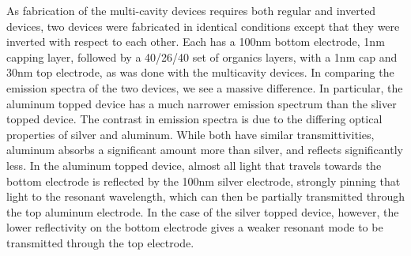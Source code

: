 \documentclass{report}
\begin{document}
            As fabrication of the multi-cavity devices requires both regular and inverted devices, two devices were fabricated in identical conditions except that they were inverted with respect to each other. Each has a 100nm bottom electrode, 1nm capping layer, followed by a 40/26/40 set of organics layers, with a 1nm cap and 30nm top electrode, as was done with the multicavity devices. In comparing the emission spectra of the two devices, we see a massive difference. In particular, the aluminum topped device has a much narrower emission spectrum than the sliver topped device. The contrast in emission spectra is due to the differing optical properties of silver and aluminum. While both have similar transmittivities, aluminum absorbs a significant amount more than silver, and reflects significantly less\cite{Stavrinou1999}. In the aluminum topped device, almost all light that travels towards the bottom electrode is reflected by the 100nm silver electrode, strongly pinning that light to the resonant wavelength, which can then be partially transmitted through the top aluminum electrode. In the case of the silver topped device, however, the lower reflectivity on the bottom electrode gives a weaker resonant mode to be transmitted through the top electrode.
\end{document}
